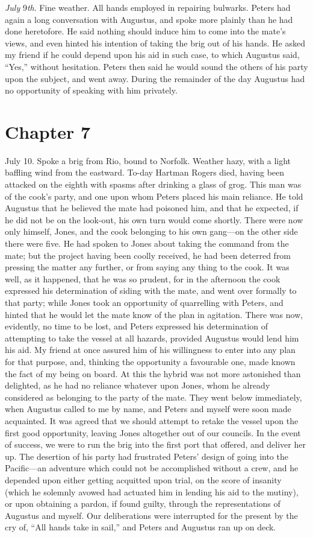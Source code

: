 \emph{July} 9\emph{th}. Fine weather. All hands employed in repairing
bulwarks. Peters had again a long conversation with Augustus, and spoke more
plainly than he had done heretofore. He said nothing should induce him to come
into the mate's views, and even hinted his intention of taking the brig out of
his hands. He asked my friend if he could depend upon his aid in such case, to
which Augustus said, ``Yes,'' without hesitation. Peters then said he would sound
the others of his party upon the subject, and went away. During the remainder of
the day Augustus had no opportunity of speaking with him privately. 

\section{Chapter 7}
July 10. Spoke a brig from Rio, bound to Norfolk. Weather hazy, with a light
baffling wind from the eastward. To-day Hartman Rogers died, having been
attacked on the eighth with spasms after drinking a glass of grog. This man was
of the cook's party, and one upon whom Peters placed his main reliance. He told
Augustus that he believed the mate had poisoned him, and that he expected, if he
did not be on the look-out, his own turn would come shortly. There were now only
himself, Jones, and the cook belonging to his own gang---on the other side there
were five. He had spoken to Jones about taking the command from the mate; but
the project having been coolly received, he had been deterred from pressing the
matter any further, or from saying any thing to the cook. It was well, as it
happened, that he was so prudent, for in the afternoon the cook expressed his
determination of siding with the mate, and went over formally to that party;
while Jones took an opportunity of quarrelling with Peters, and hinted that he
would let the mate know of the plan in agitation. There was now, evidently, no
time to be lost, and Peters expressed his determination of attempting to take
the vessel at all hazards, provided Augustus would lend him his aid. My friend
at once assured him of his willingness to enter into any plan for that purpose,
and, thinking the opportunity a favourable one, made known the fact of my being
on board. At this the hybrid was not more astonished than delighted, as he had
no reliance whatever upon Jones, whom he already considered as belonging to the
party of the mate. They went below immediately, when Augustus called to me by
name, and Peters and myself were soon made acquainted. It was agreed that we
should attempt to retake the vessel upon the first good opportunity, leaving
Jones altogether out of our councils. In the event of success, we were to run
the brig into the first port that offered, and deliver her up. The desertion of
his party had frustrated Peters' design of going into the Pacific---an adventure
which could not be accomplished without a crew, and he depended upon either
getting acquitted upon trial, on the score of insanity (which he solemnly avowed
had actuated him in lending his aid to the mutiny), or upon obtaining a pardon,
if found guilty, through the representations of Augustus and myself. Our
deliberations were interrupted for the present by the cry of, ``All hands take in
sail,'' and Peters and Augustus ran up on deck. 

